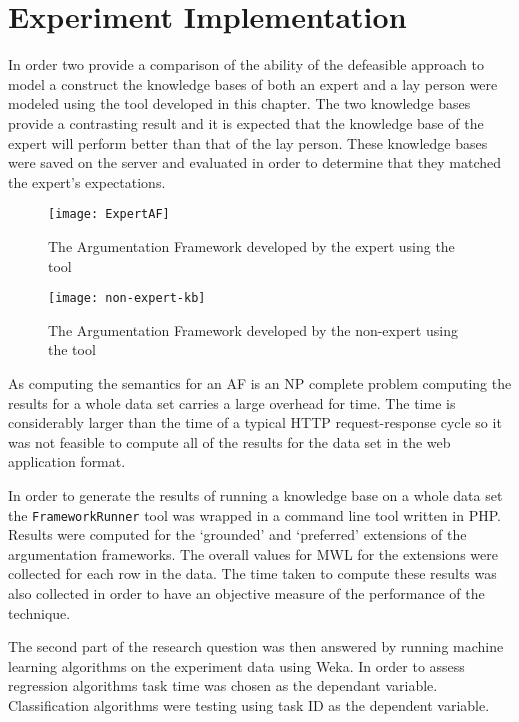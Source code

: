 
\section{Experiment Implementation}

In order two provide a comparison of the ability of the defeasible approach to model a construct the knowledge bases of both an expert and a lay person were modeled using the tool developed in this chapter. The two knowledge bases provide a contrasting result and it is expected that the knowledge base of the expert will perform better than that of the lay person. These knowledge bases were saved on the server and evaluated in order to determine that they matched the expert's expectations.

\begin{figure}[H]
\centering
\texttt{[image: ExpertAF]}
\caption{The Argumentation Framework developed by the expert using the tool}
\end{figure}

\begin{figure}[H]
\centering
\texttt{[image: non-expert-kb]}
\caption{The Argumentation Framework developed by the non-expert using the tool}
\end{figure}

As computing the semantics for an AF is an NP complete problem computing the results for a whole data set carries a large overhead for time. The time is considerably larger than the time of a typical HTTP request-response cycle so it was not feasible to compute all of the results for the data set in the web application format. 

In order to generate the results of running a knowledge base on a whole data set the \lstinline{FrameworkRunner} tool was wrapped in a command line tool written in PHP. Results were computed for the `grounded' and `preferred' extensions of the argumentation frameworks. The overall values for MWL for the extensions were collected for each row in the data. The time taken to compute these results was also collected in order to have an objective measure of the performance of the technique.

The second part of the research question was then answered by running machine learning algorithms on the experiment data using Weka. In order to assess regression algorithms task time was chosen as the dependant variable. Classification algorithms were testing using task ID as the dependent variable.

